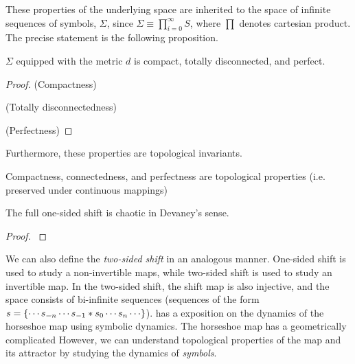 \documentclass[10pt,twoside]{book}
\begin{document}
These properties of the underlying space are inherited to the space of infinite sequences of symbols, $\Sigma$, since $\Sigma \equiv \prod\limits_{i = 0}^{\infty} S$, where $\prod$ denotes cartesian product.
The precise statement is the following proposition.
\begin{proposition}
  $\Sigma$ equipped with the metric $d$ is compact, totally disconnected, and perfect.
  \begin{proof}
    (Compactness)

    (Totally disconnectedness)

    (Perfectness)

  \end{proof}
\end{proposition}
Furthermore, these properties are topological invariants.
\begin{proposition}
  Compactness, connectedness, and perfectness are topological properties (i.e. preserved under continuous mappings)
\end{proposition}

\begin{theorem}
  The full one-sided shift is chaotic in Devaney's sense.
  \begin{proof}
    \citep{sternberg}
  \end{proof}
\end{theorem}

We can also define the \textit{two-sided shift} in an analogous manner.
One-sided shift is used to study a non-invertible maps, while two-sided shift is used to study an invertible map.
In the two-sided shift, the shift map is also injective, and the space consists of bi-infinite sequences (sequences of the form $s = \set{ \cdots s_{-n} \cdots s_{-1} * s_0 \cdots s_n \cdots }$).
\citet{wiggins} has a exposition on the dynamics of the horseshoe map using symbolic dynamics.
The horseshoe map has a geometrically complicated 
However, we can understand topological properties of the map and its attractor by studying the dynamics of \textit{symbols}.
\end{document}
